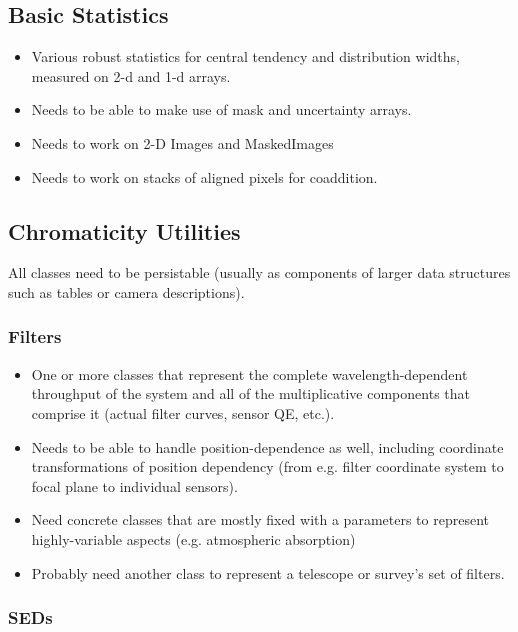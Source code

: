\subsection{Basic Statistics}
\label{sec:spStatistics}


\begin{itemize}
\item Various robust statistics for central tendency and distribution widths, measured on 2-d and 1-d arrays.
\item Needs to be able to make use of mask and uncertainty arrays.
\item Needs to work on 2-D Images and MaskedImages
\item Needs to work on stacks of aligned pixels for coaddition.
\end{itemize}


\subsection{Chromaticity Utilities}
\label{sec:spChromaticity}

All classes need to be persistable (usually as components of larger data structures such as tables or camera descriptions).

\subsubsection{Filters}
\label{sec:spChromaticityFilters}

\begin{itemize}
\item One or more classes that represent the complete wavelength-dependent throughput of the system and all of the multiplicative components that comprise it (actual filter curves, sensor QE, etc.).
\item Needs to be able to handle position-dependence as well, including coordinate transformations of position dependency (from e.g. filter coordinate system to focal plane to individual sensors).
\item Need concrete classes that are mostly fixed with a parameters to represent highly-variable aspects (e.g. atmospheric absorption)
\item Probably need another class to represent a telescope or survey's set of filters.
\end{itemize}


\subsubsection{SEDs}
\label{sec:spChromaticitySEDs}

